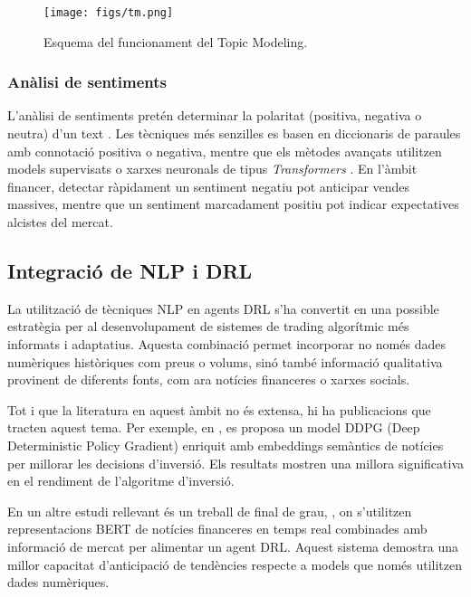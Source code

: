 \documentclass[12pt,a4paper,twoside]{book}
\begin{document}
\begin{figure}[H]
	\centering
	\texttt{[image: figs/tm.png]}
	\caption{Esquema del funcionament del Topic Modeling\cite{esquemaRL}.}
	\label{fig:context-anoni1}
\end{figure}

\subsubsection{Anàlisi de sentiments}

L'anàlisi de sentiments pretén determinar la polaritat (positiva, negativa o neutra) d'un text \cite{kennedy2006sentiment}. Les tècniques més senzilles es basen en diccionaris de paraules amb connotació positiva o negativa, mentre que els mètodes avançats utilitzen models supervisats o xarxes neuronals de tipus \emph{Transformers} \cite{TABINDAKOKAB2022100157}. En l'àmbit financer, detectar ràpidament un sentiment negatiu pot anticipar vendes massives, mentre que un sentiment marcadament positiu pot indicar expectatives alcistes del mercat.


\subsection{Integració de NLP i DRL}

La utilització de tècniques NLP en agents DRL s'ha convertit en una possible estratègia per al desenvolupament de sistemes de trading algorítmic més informats i adaptatius. Aquesta combinació permet incorporar no només dades numèriques històriques com preus o volums, sinó també informació qualitativa provinent de diferents fonts, com ara notícies financeres o xarxes socials.

Tot i que la literatura en aquest àmbit no és extensa, hi ha publicacions que tracten aquest tema. Per exemple, en \cite{gangopadhyay}, es proposa un model DDPG (Deep Deterministic Policy Gradient) enriquit amb embeddings semàntics de notícies per millorar les decisions d'inversió. Els resultats mostren una millora significativa en el rendiment de l'algoritme d'inversió.

En un altre estudi rellevant és un treball de final de grau, \cite{alvarez2023real}, on s'utilitzen representacions BERT de notícies financeres en temps real combinades amb informació de mercat per alimentar un agent DRL. Aquest sistema demostra una millor capacitat d'anticipació de tendències respecte a models que només utilitzen dades numèriques.
\end{document}
